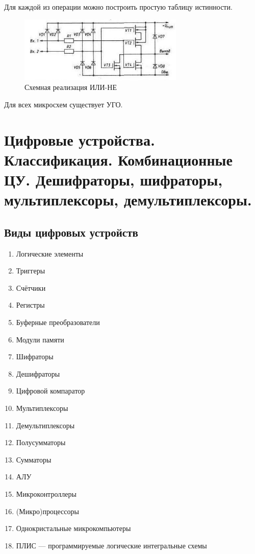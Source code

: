 \documentclass[unicode, 12pt, a4paper, oneside]{article}
\begin{document}
Для каждой из операции можно построить простую таблицу истинности.

\begin{figure}[H]
\centering
\includegraphics[width=0.7\textwidth]{10_or_not.png}
\caption{Схемная реализация ИЛИ-НЕ}
\label{fig:10_or_not}
\end{figure}

Для всех микросхем существует УГО.


\section{Цифровые устройства. Классификация. Комбинационные ЦУ. Дешифраторы, шифраторы, мультиплексоры, демультиплексоры.}

\subsection*{Виды цифровых устройств}

\begin{enumerate}
\item Логические элементы
\item Триггеры
\item Счётчики
\item Регистры
\item Буферные преобразователи
\item Модули памяти
\item Шифраторы
\item Дешифраторы
\item Цифровой компаратор
\item Мультиплексоры
\item Демультиплексоры
\item Полусумматоры
\item Сумматоры
\item АЛУ
\item Микроконтроллеры
\item (Микро)процессоры
\item Однокристальные микрокомпьютеры
\item ПЛИС — программируемые логические интегральные схемы
\end{enumerate}
\end{document}
